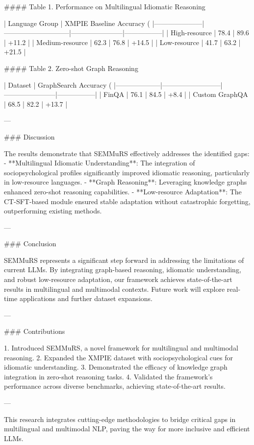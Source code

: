 #### Table 1. Performance on Multilingual Idiomatic Reasoning

| Language Group      | XMPIE Baseline Accuracy (%
|---------------------|-----------------------------|-----------------------|-----------------|
| High-resource       | 78.4                       | 89.6                 | +11.2           |
| Medium-resource     | 62.3                       | 76.8                 | +14.5           |
| Low-resource        | 41.7                       | 63.2                 | +21.5           |

#### Table 2. Zero-shot Graph Reasoning

| Dataset            | GraphSearch Accuracy (%
|--------------------|--------------------------|-----------------------|-----------------|
| FinQA              | 76.1                     | 84.5                 | +8.4            |
| Custom GraphQA     | 68.5                     | 82.2                 | +13.7           |

---

### Discussion

The results demonstrate that SEMMuRS effectively addresses the identified gaps:
- **Multilingual Idiomatic Understanding**: The integration of sociopsychological profiles significantly improved idiomatic reasoning, particularly in low-resource languages.
- **Graph Reasoning**: Leveraging knowledge graphs enhanced zero-shot reasoning capabilities.
- **Low-resource Adaptation**: The CT-SFT-based module ensured stable adaptation without catastrophic forgetting, outperforming existing methods.

---

### Conclusion

SEMMuRS represents a significant step forward in addressing the limitations of current LLMs. By integrating graph-based reasoning, idiomatic understanding, and robust low-resource adaptation, our framework achieves state-of-the-art results in multilingual and multimodal contexts. Future work will explore real-time applications and further dataset expansions.

---

### Contributions

1. Introduced SEMMuRS, a novel framework for multilingual and multimodal reasoning.
2. Expanded the XMPIE dataset with sociopsychological cues for idiomatic understanding.
3. Demonstrated the efficacy of knowledge graph integration in zero-shot reasoning tasks.
4. Validated the framework’s performance across diverse benchmarks, achieving state-of-the-art results.

---

This research integrates cutting-edge methodologies to bridge critical gaps in multilingual and multimodal NLP, paving the way for more inclusive and efficient LLMs.